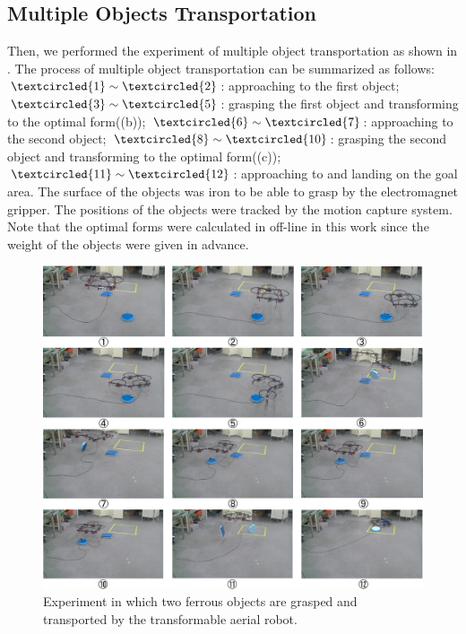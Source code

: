 \subsection{Multiple Objects Transportation}
Then, we performed the experiment of multiple object transportation as shown in . The process of multiple object transportation can be summarized as follows:$\textcircled{\scriptsize 1}\sim \textcircled{\scriptsize 2}$: approaching to the first object; $\textcircled{\scriptsize 3}\sim \textcircled{\scriptsize 5}$: grasping the first object and transforming to the optimal form((b)); $\textcircled{\scriptsize 6}\sim \textcircled{\scriptsize 7}$: approaching to the second object; $\textcircled{\scriptsize 8}\sim \textcircled{\scriptsize 10}$: grasping the second object and transforming to the optimal form((c)); $\textcircled{\scriptsize 11}\sim \textcircled{\scriptsize 12}$: approaching to and landing on the goal area. The surface of the objects was iron to be able to grasp by the electromagnet gripper. The positions of the objects were tracked by the motion capture system. Note that the optimal forms were calculated in off-line in this work since the weight of the objects were given in advance.
\begin{figure}[t]
  \begin{center}
    \includegraphics[width=1.0\columnwidth]{figs/experiment.pdf}
  \end{center}
  \caption{Experiment in which two ferrous objects are grasped and transported by the transformable aerial robot.\label{figure:experiment}}
\end{figure}

